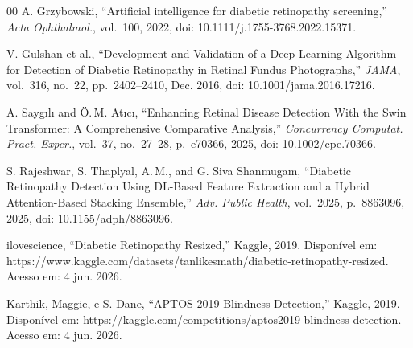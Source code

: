 \documentclass[conference]{IEEEtran}
\begin{document}
\begin{thebibliography}{00}
 A. Grzybowski, ``Artificial intelligence for
diabetic retinopathy screening,'' \textit{Acta Ophthalmol.}, vol.~100,
2022, doi: 10.1111/j.1755-3768.2022.15371.

 V. Gulshan et al., ``Development and Validation of
a Deep Learning Algorithm for Detection of Diabetic Retinopathy in
Retinal Fundus Photographs,'' \textit{JAMA}, vol.~316, no.~22,
pp.~2402--2410, Dec. 2016, doi: 10.1001/jama.2016.17216.

 A. Sayg{\i}l{\i} and \"O.\,M. At{\i}c{\i},
``Enhancing Retinal Disease Detection With the Swin Transformer: A
Comprehensive Comparative Analysis,''
\textit{Concurrency Computat. Pract. Exper.}, vol.~37, no.~27--28,
p.~e70366, 2025, doi: 10.1002/cpe.70366.

 S. Rajeshwar, S. Thaplyal, A.\,M., and
G. Siva Shanmugam, ``Diabetic Retinopathy Detection Using DL-Based
Feature Extraction and a Hybrid Attention-Based Stacking Ensemble,''
\textit{Adv. Public Health}, vol.~2025, p.~8863096, 2025,
doi: 10.1155/adph/8863096.

 ilovescience, ``Diabetic Retinopathy Resized,''
Kaggle, 2019. Dispon\'ivel em:
https://www.kaggle.com/datasets/tanlikesmath/diabetic-retinopathy-resized.
Acesso em: 4 jun. 2026.

 Karthik, Maggie, e S. Dane, ``APTOS 2019 Blindness
Detection,'' Kaggle, 2019. Dispon\'ivel em:
https://kaggle.com/competitions/aptos2019-blindness-detection.
Acesso em: 4 jun. 2026.
\end{thebibliography}
\end{document}
